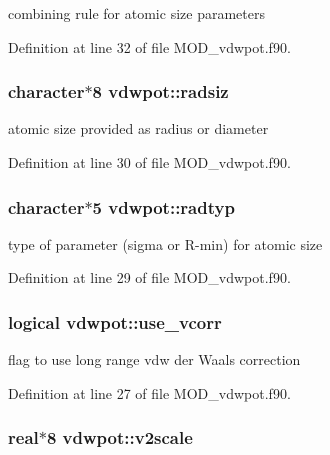 combining rule for atomic size parameters 



Definition at line 32 of file M\-O\-D\-\_\-vdwpot.\-f90.

\hypertarget{classvdwpot_a3049138d7e172d8f06fece6c7640eb75}{
\subsubsection[{radsiz}]{\setlength{\rightskip}{0pt plus 5cm}character$\ast$8 vdwpot\-::radsiz}}\label{classvdwpot_a3049138d7e172d8f06fece6c7640eb75}


atomic size provided as radius or diameter 



Definition at line 30 of file M\-O\-D\-\_\-vdwpot.\-f90.

\hypertarget{classvdwpot_a976399d6ca4204cc92e4e5210f3a6e7a}{
\subsubsection[{radtyp}]{\setlength{\rightskip}{0pt plus 5cm}character$\ast$5 vdwpot\-::radtyp}}\label{classvdwpot_a976399d6ca4204cc92e4e5210f3a6e7a}


type of parameter (sigma or R-\/min) for atomic size 



Definition at line 29 of file M\-O\-D\-\_\-vdwpot.\-f90.

\hypertarget{classvdwpot_af974466e0dc234aa8a97ab288eb69c73}{
\subsubsection[{use\-\_\-vcorr}]{\setlength{\rightskip}{0pt plus 5cm}logical vdwpot\-::use\-\_\-vcorr}}\label{classvdwpot_af974466e0dc234aa8a97ab288eb69c73}


flag to use long range vdw der Waals correction 



Definition at line 27 of file M\-O\-D\-\_\-vdwpot.\-f90.

\hypertarget{classvdwpot_a571a8d4ecd0f85976b361c08cb999e18}{
\subsubsection[{v2scale}]{\setlength{\rightskip}{0pt plus 5cm}real$\ast$8 vdwpot\-::v2scale}}\label{classvdwpot_a571a8d4ecd0f85976b361c08cb999e18}


